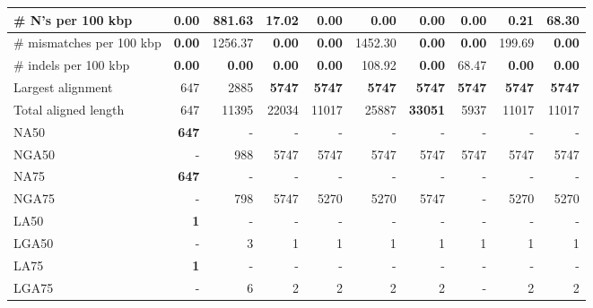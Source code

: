 \documentclass[12pt,a4paper]{article}
\begin{document}
\begin{table}[ht]
\begin{center}
\begin{tabular}{|l*{9}{|r}|}
\# N's per 100 kbp & {\bf 0.00} & 881.63 & 17.02 & {\bf 0.00} & {\bf 0.00} & {\bf 0.00} & {\bf 0.00} & 0.21 & 68.30 \\ \hline
\# mismatches per 100 kbp & {\bf 0.00} & 1256.37 & {\bf 0.00} & {\bf 0.00} & 1452.30 & {\bf 0.00} & {\bf 0.00} & 199.69 & {\bf 0.00} \\ \hline
\# indels per 100 kbp & {\bf 0.00} & {\bf 0.00} & {\bf 0.00} & {\bf 0.00} & 108.92 & {\bf 0.00} & 68.47 & {\bf 0.00} & {\bf 0.00} \\ \hline
Largest alignment & 647 & 2885 & {\bf 5747} & {\bf 5747} & {\bf 5747} & {\bf 5747} & {\bf 5747} & {\bf 5747} & {\bf 5747} \\ \hline
Total aligned length & 647 & 11395 & 22034 & 11017 & 25887 & {\bf 33051} & 5937 & 11017 & 11017 \\ \hline
NA50 & {\bf 647} & - & - & - & - & - & - & - & - \\ \hline
NGA50 & - & 988 & 5747 & 5747 & 5747 & 5747 & 5747 & 5747 & 5747 \\ \hline
NA75 & {\bf 647} & - & - & - & - & - & - & - & - \\ \hline
NGA75 & - & 798 & 5747 & 5270 & 5270 & 5747 & - & 5270 & 5270 \\ \hline
LA50 & {\bf 1} & - & - & - & - & - & - & - & - \\ \hline
LGA50 & - & 3 & 1 & 1 & 1 & 1 & 1 & 1 & 1 \\ \hline
LA75 & {\bf 1} & - & - & - & - & - & - & - & - \\ \hline
LGA75 & - & 6 & 2 & 2 & 2 & 2 & - & 2 & 2 \\ \hline
\end{tabular}
\end{center}
\end{table}
\end{document}
